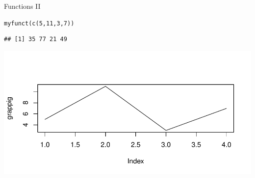 \documentclass[xcolor=table,      handout ,    xcolor=dvipsnames]{beamer}\usepackage[]{graphicx}\usepackage[]{color}
\makeatletter
\newcommand{\hlnum}[1]{\textcolor[rgb]{0,0,0}{#1}}
\newcommand{\hlstd}[1]{\textcolor[rgb]{0,0,0}{#1}}
\newcommand{\hlkwd}[1]{\textcolor[rgb]{0,0,1}{#1}}
\newenvironment{kframe}{%
 \def\at@end@of@kframe{}%
 \ifinner\ifhmode%
  \def\at@end@of@kframe{\end{minipage}}%
  \begin{minipage}{\columnwidth}%
 \fi\fi%
 \def\FrameCommand##1{\hskip\@totalleftmargin \hskip-\fboxsep
 \colorbox{shadecolor}{##1}\hskip-\fboxsep
     \hskip-\linewidth \hskip-\@totalleftmargin \hskip\columnwidth}%
 \MakeFramed {\advance\hsize-\width
   \@totalleftmargin\z@ \linewidth\hsize
   \@setminipage}}%
 {\par\unskip\endMakeFramed%
 \at@end@of@kframe}
\newenvironment{knitrout}{}{} %
\makeatother
\begin{document}
\begin{frame}[fragile]{Functions II}
\begin{knitrout}
\color{fgcolor}\begin{kframe}
\begin{alltt}
\hlkwd{myfunct}\hlstd{(}   \hlkwd{c}\hlstd{(}\hlnum{5}\hlstd{,}\hlnum{11}\hlstd{,}\hlnum{3}\hlstd{,}\hlnum{7}\hlstd{)  )}
\end{alltt}
\begin{verbatim}
## [1] 35 77 21 49
\end{verbatim}
\end{kframe}

{\centering \includegraphics[width=\textwidth]{./fig/funct3-1} 

}



\end{knitrout}
\end{frame}

\end{document}
